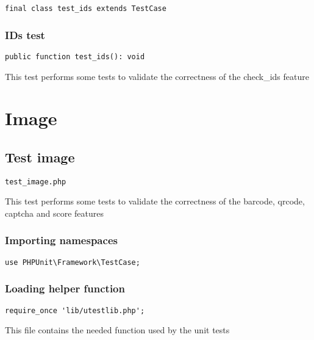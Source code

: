 \documentclass[a4paper]{article}
\begin{document}
\begin{lstlisting}
final class test_ids extends TestCase
\end{lstlisting}

\hypertarget{toc242}{}
\subsubsection{IDs test}

\begin{lstlisting}
public function test_ids(): void
\end{lstlisting}

This test performs some tests to validate the correctness
of the check\_ids feature


\hypertarget{toc243}{}
\section{Image}

\hypertarget{toc244}{}
\subsection{Test image}

\begin{lstlisting}
test_image.php
\end{lstlisting}

This test performs some tests to validate the correctness
of the barcode, qrcode, captcha and score features

\hypertarget{toc245}{}
\subsubsection{Importing namespaces}

\begin{lstlisting}
use PHPUnit\Framework\TestCase;
\end{lstlisting}

\hypertarget{toc246}{}
\subsubsection{Loading helper function}

\begin{lstlisting}
require_once 'lib/utestlib.php';
\end{lstlisting}

This file contains the needed function used by the unit tests

\hypertarget{toc247}{}
\end{document}

